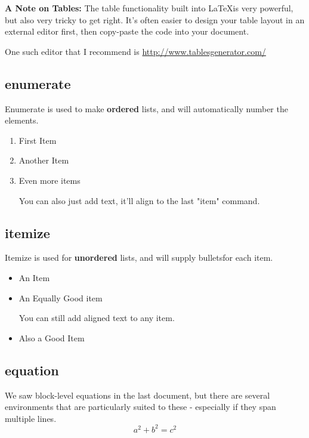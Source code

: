 \documentclass{article}
\begin{document}
\textbf{A Note on Tables:} The table functionality built into \LaTeX is very powerful, but also very tricky to get right. It's often easier to design your table layout in an external editor first, then copy-paste the code into your document.

One such editor that I recommend is \url{http://www.tablesgenerator.com/}

\subsection{enumerate}
Enumerate is used to make \textbf{ordered} lists, and will automatically number the elements.

\begin{enumerate}
  \item First Item
  \item Another Item
  \item Even more items
  
  You can also just add text, it'll align to the last "item" command.
\end{enumerate}

\subsection{itemize}
Itemize is used for \textbf{unordered} lists, and will supply bulletsfor each item.

\begin{itemize}
  \item An Item
  \item An Equally Good item
  
    You can still add aligned text to any item.

  \item Also a Good Item
  
\end{itemize}

\subsection{equation}
We saw block-level equations in the last document, but there are several environments that are particularly suited to these - especially if they span multiple lines.
\begin{equation}
    a^2 + b^2 = c^2
    \label{eq:pythagoras} %
\end{equation}
\end{document}
